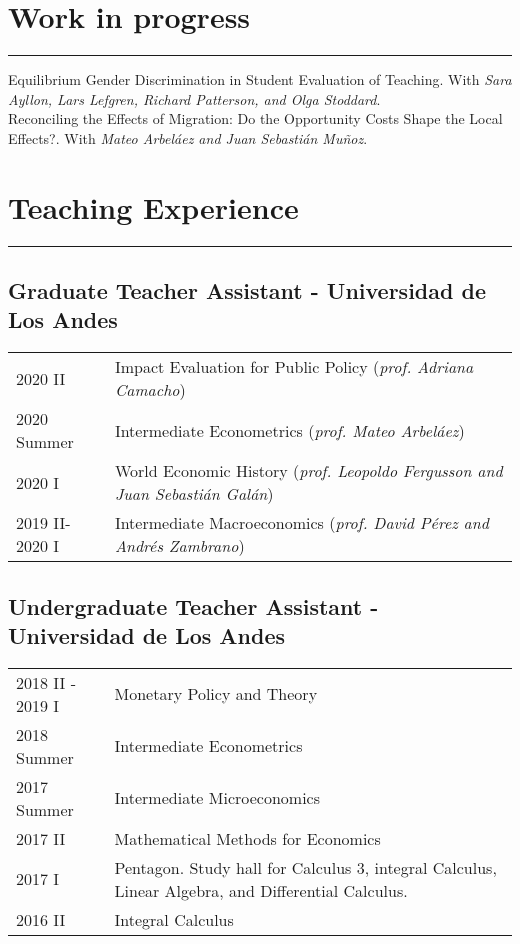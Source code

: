 \documentclass[12pt, letterpaper]{article}
\begin{document}
\vspace{-5mm}

\section*{Work in progress}
\vspace*{-8mm}
\noindent \rule{\linewidth}{0.2mm}
\noindent Equilibrium Gender Discrimination in Student Evaluation of Teaching. With \textit{Sara Ayllon, Lars Lefgren, Richard Patterson, and Olga Stoddard}. \\ [-3mm]

\noindent Reconciling the Effects of Migration: Do the Opportunity Costs Shape the Local Effects?. With \textit{Mateo Arbeláez and Juan Sebastián Muñoz}. \\ [-3mm]

\vspace{-7mm}

\section*{Teaching Experience}
\vspace*{-8mm}
\noindent \rule{\linewidth}{0.2mm}
\vspace*{-12mm}
\subsection*{Graduate Teacher Assistant - Universidad de Los Andes}
\vspace*{-2mm}
\noindent
\begin{tabular}{@{}p{3cm}p{13.7cm}}
2020 II & Impact Evaluation for Public Policy (\textit{prof. Adriana Camacho}) \\
2020 Summer & Intermediate Econometrics (\textit{prof. Mateo Arbeláez}) \\
2020 I & World Economic History (\small{\textit{prof. Leopoldo Fergusson and Juan Sebastián Galán}}) \\
2019 II-2020 I & Intermediate Macroeconomics (\textit{prof. David Pérez and Andrés Zambrano}) 
\end{tabular}
\vspace*{-4mm}
\subsection*{Undergraduate Teacher Assistant - Universidad de Los Andes}
\vspace*{-2mm}
\noindent
\begin{tabular}{@{}p{3cm}p{13.7cm}}
2018 II - 2019 I    &       Monetary Policy and Theory \\
2018 Summer         &       Intermediate Econometrics \\
2017 Summer         &       Intermediate Microeconomics \\
2017 II             &       Mathematical Methods for Economics \\ 
2017 I              &       Pentagon. Study hall for Calculus 3, integral Calculus, Linear Algebra, and Differential Calculus. \\
2016 II             &       Integral Calculus 
\end{tabular}
\end{document}

